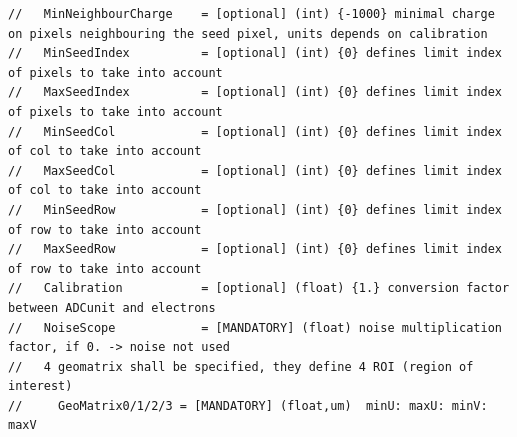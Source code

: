 \documentclass[a4paper, 12pt, twoside]{article}
\begin{document}
\begin{verbatim}
//   MinNeighbourCharge    = [optional] (int) {-1000} minimal charge on pixels neighbouring the seed pixel, units depends on calibration
//   MinSeedIndex          = [optional] (int) {0} defines limit index of pixels to take into account
//   MaxSeedIndex          = [optional] (int) {0} defines limit index of pixels to take into account
//   MinSeedCol            = [optional] (int) {0} defines limit index of col to take into account
//   MaxSeedCol            = [optional] (int) {0} defines limit index of col to take into account
//   MinSeedRow            = [optional] (int) {0} defines limit index of row to take into account
//   MaxSeedRow            = [optional] (int) {0} defines limit index of row to take into account
//   Calibration           = [optional] (float) {1.} conversion factor between ADCunit and electrons
//   NoiseScope            = [MANDATORY] (float) noise multiplication factor, if 0. -> noise not used
//   4 geomatrix shall be specified, they define 4 ROI (region of interest)
//     GeoMatrix0/1/2/3 = [MANDATORY] (float,um)  minU: maxU: minV: maxV


\end{verbatim}
\end{document}
